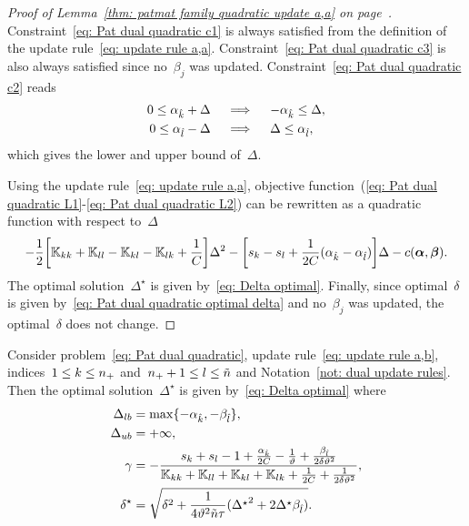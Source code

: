 \begin{proof}[Proof of Lemma~\ref{thm: patmat family quadratic update a,a} on page~\pageref{thm: patmat family quadratic update a,a}]
  Constraint~\eqref{eq: Pat dual quadratic c1} is always satisfied from the definition of the update rule~\eqref{eq: update rule a,a}. Constraint~\eqref{eq: Pat dual quadratic c3} is also always satisfied since no~$\beta_j$ was updated. Constraint~\eqref{eq: Pat dual quadratic c2} reads
  \begin{align*}
    0 \leq \alpha_{\hat{k}} + \Delta
    & \quad \implies \quad
    - \alpha_{\hat{k}} \leq \Delta, \\
    0 \leq \alpha_{\hat{l}} - \Delta
    & \quad \implies \quad
    \Delta \leq \alpha_{\hat{l}},
  \end{align*}
  which gives the lower and upper bound of~$\Delta.$
  
  Using the update rule~\eqref{eq: update rule a,a}, objective function~(\ref{eq: Pat dual quadratic L1}-\ref{eq: Pat dual quadratic L2}) can be rewritten as a quadratic function with respect to~$\Delta$
  \begin{equation*}
    - \frac{1}{2} \Brac[s]{\K_{kk} + \K_{ll} - \K_{kl} - \K_{lk} + \frac{1}{C}} \Delta^2
    - \Brac[s]{s_k - s_l + \frac{1}{2C}(\alphak - \alphal)} \Delta
    - c(\bm{\alpha}, \bm{\beta}).
  \end{equation*}
  The optimal solution~$\Delta^{\star}$ is given by~\eqref{eq: Delta optimal}. Finally, since optimal~$\delta$ is given by~\eqref{eq: Pat dual quadratic optimal delta} and no~$\beta_j$ was updated, the optimal~$\delta$ does not change.
\end{proof}

\begin{lemma}\label{thm: patmat family quadratic update a,b}
  Consider problem~\eqref{eq: Pat dual quadratic}, update rule~\eqref{eq: update rule a,b}, indices~$1 \leq k \leq n_{+}$ and~$n_{+} + 1 \leq l \leq \tilde{n}$ and Notation~\ref{not: dual update rules}. Then the optimal solution~$\Delta^{\star}$ is given by~\eqref{eq: Delta optimal} where
  \begin{align*}
    \Delta_{lb} & = \max\{- \alpha_{\hat{k}}, - \beta_{\hat{l}}\}, \\
    \Delta_{ub} & = +\infty, \\
    \gamma      & = -\frac{s_k + s_l  - 1 + \frac{\alpha_{\hat{k}}}{2C} - \frac{1}{\vartheta} + \frac{\beta_{\hat{l}}}{2 \delta \vartheta^2}}{\mathbb{K}_{kk} + \mathbb{K}_{ll} + \mathbb{K}_{kl} + \mathbb{K}_{lk} + \frac{1}{2C} + \frac{1}{2 \delta \vartheta^2}}, \\
    \delta^{\star}  & = \sqrt{\delta^2 + \frac{1}{4 \vartheta^2 \tilde{n} \tau}({\Delta^{\star}}^2 + 2 \Delta^{\star} \beta_{\hat{l}})}.
  \end{align*}
\end{lemma}

